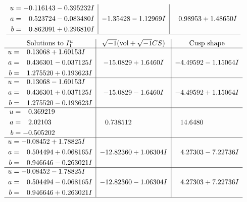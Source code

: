 \documentclass[1p]{elsarticle_modified}
\theoremstyle{definition}
\newcommand{\I}{\sqrt{-1}}
\begin{document}
$$\begin{array}{c|c|c}
\begin{aligned}
u &= -0.116143 - 0.395232 I \\
a &= \phantom{-}0.523724 - 0.083480 I \\
b &= \phantom{-}0.862091 + 0.296810 I\end{aligned}
 & -1.35428 - 1.12969 I & \phantom{-}0.98953 + 1.48650 I\\
 \hline 
 \end{array}$$\newpage$$\begin{array}{c|c|c}  
\text{Solutions to }I^u_{1}& \I (\text{vol} + \sqrt{-1}CS) & \text{Cusp shape}\\
 \hline 
\begin{aligned}
u &= \phantom{-}0.13068 + 1.60153 I \\
a &= \phantom{-}0.436301 - 0.037125 I \\
b &= \phantom{-}1.275520 + 0.193623 I\end{aligned}
 & -15.0829 + 1.6460 I & -4.49592 - 1.15064 I \\ \hline\begin{aligned}
u &= \phantom{-}0.13068 - 1.60153 I \\
a &= \phantom{-}0.436301 + 0.037125 I \\
b &= \phantom{-}1.275520 - 0.193623 I\end{aligned}
 & -15.0829 - 1.6460 I & -4.49592 + 1.15064 I \\ \hline\begin{aligned}
u &= \phantom{-}0.369219\phantom{ +0.000000I} \\
a &= \phantom{-}2.02103\phantom{ +0.000000I} \\
b &= -0.505202\phantom{ +0.000000I}\end{aligned}
 & \phantom{-}0.738512\phantom{ +0.000000I} & \phantom{-}14.6480\phantom{ +0.000000I} \\ \hline\begin{aligned}
u &= -0.08452 + 1.78825 I \\
a &= \phantom{-}0.504494 + 0.068165 I \\
b &= \phantom{-}0.946646 - 0.263021 I\end{aligned}
 & -12.82360 + 1.06304 I & \phantom{-}4.27303 - 7.22736 I \\ \hline\begin{aligned}
u &= -0.08452 - 1.78825 I \\
a &= \phantom{-}0.504494 - 0.068165 I \\
b &= \phantom{-}0.946646 + 0.263021 I\end{aligned}
 & -12.82360 - 1.06304 I & \phantom{-}4.27303 + 7.22736 I\\
 \hline 
 \end{array}$$\newpage\newpage\renewcommand{\arraystretch}{1}
\end{document}
